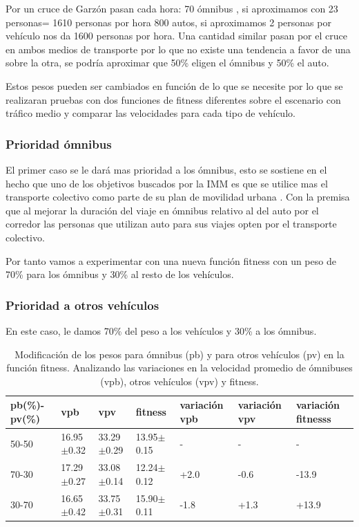 Por un cruce de Garzón pasan cada hora:
70 ómnibus , si aproximamos con 23 personas= 1610 personas por hora
800 autos, si aproximamos  2 personas por vehículo nos da 1600 personas por hora.
Una cantidad similar  pasan por el cruce en ambos medios de transporte por lo que no existe una tendencia a favor de una sobre la otra, se podría aproximar que 50\% eligen el ómnibus y 50\% el auto.



Estos pesos pueden ser cambiados en función de lo que se necesite por lo que se realizaran pruebas con dos funciones de fitness diferentes sobre el escenario con tráfico medio y comparar las velocidades para cada tipo de vehículo.


\subsubsection{Prioridad ómnibus}
El primer caso se le dará mas prioridad a los ómnibus, esto se sostiene en el hecho que uno de los objetivos buscados por la IMM  es que se utilice mas el transporte colectivo como parte de su plan de movilidad urbana \citep{PlanMovilidad}. Con la premisa que al mejorar la duración del viaje en ómnibus relativo al del auto por el corredor las personas que utilizan auto para sus viajes opten por el transporte colectivo.

Por tanto vamos a experimentar con una nueva función fitness con un peso de 70\% para los ómnibus y 30\% al resto de los vehículos.


\subsubsection{Prioridad a otros vehículos}

En este caso, le damos 70\% del peso a los vehículos y 30\% a los ómnibus.



\begin{table}[h]
	\renewcommand{\arraystretch}{1.2}
	\caption{Modificación de los pesos para ómnibus (pb) y para otros vehículos (pv) en la función fitness. Analizando las variaciones en la velocidad promedio de ómnibuses (vpb),  otros vehículos (vpv) y fitness. }
	\label{table:analisis_fitness}
	\centering
	\begin{tabular}{p{2.5cm}p{2cm}p{2cm}p{2cm}p{1.2cm}p{1.2cm}p{1.2cm} }
		\hline
		
		pb(\%)-pv(\%)& 
		vpb & 
		vpv &
		fitness &
		variación \newline vpb &
		variación \newline vpv &
		variación \newline fitnesss
		\\ 
		\hline
		50-50  & 16.95$\pm$0.32 & 33.29$\pm$0.29 & 13.95$\pm$0.15  &- & - & -\\		
		70-30  & 17.29$\pm$0.27 & 33.08$\pm$0.14 & 12.24$\pm$0.12  & +2.0 & -0.6 & -13.9\\		
		30-70 & 16.65$\pm$0.42 & 33.75$\pm$0.31 & 15.90$\pm$0.11  & -1.8 & +1.3 & +13.9\\
		\hline
		
		
		\hline
	\end{tabular}
\end{table}


